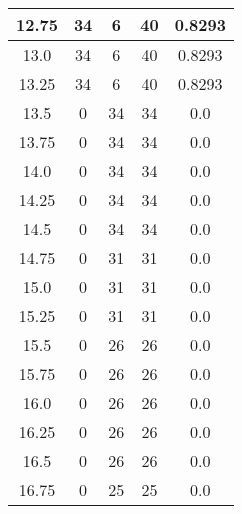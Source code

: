 \documentclass[letterpaper, 12pt]{article}
\begin{document}
\begin{longtable}{|c|c|c|c|c|}
\hline
12.75 & 34 & 6 & 40 & 0.8293 \\
\hline
13.0 & 34 & 6 & 40 & 0.8293 \\
\hline
13.25 & 34 & 6 & 40 & 0.8293 \\
\hline
13.5 & 0 & 34 & 34 & 0.0 \\
\hline
13.75 & 0 & 34 & 34 & 0.0 \\
\hline
14.0 & 0 & 34 & 34 & 0.0 \\
\hline
14.25 & 0 & 34 & 34 & 0.0 \\
\hline
14.5 & 0 & 34 & 34 & 0.0 \\
\hline
14.75 & 0 & 31 & 31 & 0.0 \\
\hline
15.0 & 0 & 31 & 31 & 0.0 \\
\hline
15.25 & 0 & 31 & 31 & 0.0 \\
\hline
15.5 & 0 & 26 & 26 & 0.0 \\
\hline
15.75 & 0 & 26 & 26 & 0.0 \\
\hline
16.0 & 0 & 26 & 26 & 0.0 \\
\hline
16.25 & 0 & 26 & 26 & 0.0 \\
\hline
16.5 & 0 & 26 & 26 & 0.0 \\
\hline
16.75 & 0 & 25 & 25 & 0.0 \\
\hline
\end{longtable}
\end{document}
